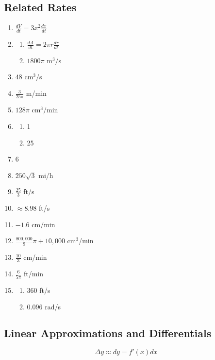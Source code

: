 \documentclass{article}
\begin{document}
\subsection{Related Rates}
\begin{enumerate}
  \item $\frac{dV}{dt}=3x^2\frac{dx}{dt}$
  \item
    \begin{enumerate}
      \item $\frac{dA}{dt}=2\pi r\frac{dr}{dt}$
      \item $1800\pi$ m$^3/$s
    \end{enumerate}
  \item $48$ cm$^3/$s
    \setcounter{enumi}{4}
  \item $\frac{3}{25\pi}$ m/min
    \setcounter{enumi}{6}
  \item $128\pi$ cm$^3$/min
    \setcounter{enumi}{8}
  \item
    \begin{enumerate}
      \item 1
      \item 25
    \end{enumerate}
  \item 6
    \setcounter{enumi}{12}
  \item $250\sqrt{3}$ mi/h
    \setcounter{enumi}{14}
  \item $\frac{25}{3}$ ft/s
    \setcounter{enumi}{18}
  \item $\approx8.98$ ft/s
    \setcounter{enumi}{20}
  \item $-1.6$ cm/min
    \setcounter{enumi}{24}
  \item $\frac{800,000}{9}\pi + 10,000$ cm$^3$/min
    \setcounter{enumi}{26}
  \item $\frac{10}{3}$ cm/min
    \setcounter{enumi}{28}
  \item $\frac{6}{5\pi}$ ft/min
    \setcounter{enumi}{42}
  \item
    \begin{enumerate}
      \item 360 ft/s
      \item $0.096$ rad/s
    \end{enumerate}
\end{enumerate}

\subsection{Linear Approximations and Differentials}
\[\Delta y \approx dy=f'(x)dx\]
\end{document}
